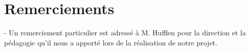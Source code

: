 \documentclass[a4paper,12pt]{report}
\begin{document}
    \newpage
    \section*{Remerciements}
    - Un remerciement particulier est adressé à M. Hufflen pour la direction et la pédagogie qu'il nous a apporté lors de la réalisation de notre projet.

    \newpage
    \tableofcontents
    \newpage

    \glsaddall
    \printglossaries
    \newpage

    
    
    
    
\end{document}
